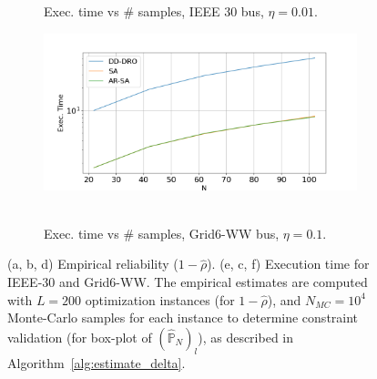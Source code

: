 \begin{figure}[hbt]
\begin{subfigure}{.50\textwidth}
  \caption{Exec. time vs $\#$ samples, IEEE 30 bus, $\eta = 0.01$.%
  }
  \label{fig:ieee30time}
\end{subfigure}
\begin{subfigure}{.50\textwidth}
  \centering
\hspace{10mm}\includegraphics[width=0.95\linewidth]{Dissertation/images/dynamic/grid6/dd-dro/exec_time_N_102_eta_0.1.png}~~~~~~\hfill
  \caption{Exec. time vs $\#$ samples, Grid6-WW bus, $\eta = 0.1$.%
  }
  \label{fig:grid6time-dd-dro}
\end{subfigure}
\vspace{-7mm}
\caption{(a, b, d) Empirical reliability ($1-\hat{\rho}$). (e, c, f) Execution time for IEEE-30 and Grid6-WW. The empirical estimates are computed with $L = 200$ optimization instances (for $1-\hat{\rho}$), and $N_{MC}=10^4$ Monte-Carlo samples for each instance to determine constraint validation (for box-plot of $(\hat{\mathbb{P}}_N)_l$), as described in Algorithm~\ref{alg:estimate_delta}.  
}
\label{fig:dyn_ieee118}
\end{figure}


